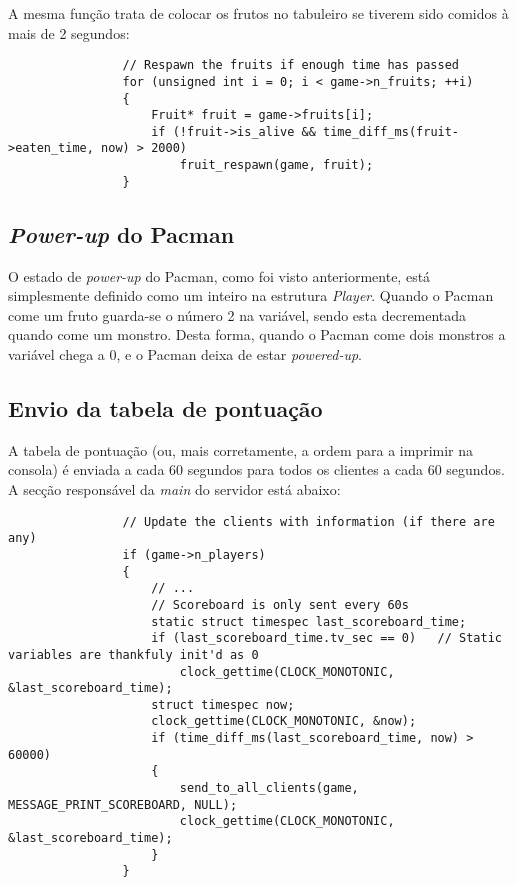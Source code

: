\documentclass[a4paper]{report}
\begin{document}
            \par A mesma função trata de colocar os frutos no tabuleiro se tiverem sido comidos à mais de 2 segundos:
            \begin{lstlisting}
                // Respawn the fruits if enough time has passed
                for (unsigned int i = 0; i < game->n_fruits; ++i)
                {
                    Fruit* fruit = game->fruits[i];
                    if (!fruit->is_alive && time_diff_ms(fruit->eaten_time, now) > 2000)
                        fruit_respawn(game, fruit);
                }            
            \end{lstlisting}

        \subsection{\textit{Power-up} do Pacman}
            \par O estado de \textit{power-up} do Pacman, como foi visto anteriormente, está simplesmente definido como um inteiro na estrutura \textit{Player}. Quando o Pacman come um fruto guarda-se o número 2 na variável, sendo esta decrementada quando come um monstro. Desta forma, quando o Pacman come dois monstros a variável chega a 0, e o Pacman deixa de estar \textit{powered-up}.

        \subsection{Envio da tabela de pontuação}
            \par A tabela de pontuação (ou, mais corretamente, a ordem para a imprimir na consola) é enviada a cada 60 segundos para todos os clientes a cada 60 segundos. A secção responsável da \textit{main} do servidor está abaixo:
            \begin{lstlisting}
                // Update the clients with information (if there are any)
                if (game->n_players)
                {
                    // ...
                    // Scoreboard is only sent every 60s
                    static struct timespec last_scoreboard_time;
                    if (last_scoreboard_time.tv_sec == 0)   // Static variables are thankfuly init'd as 0
                        clock_gettime(CLOCK_MONOTONIC, &last_scoreboard_time);
                    struct timespec now;
                    clock_gettime(CLOCK_MONOTONIC, &now);
                    if (time_diff_ms(last_scoreboard_time, now) > 60000)
                    {
                        send_to_all_clients(game, MESSAGE_PRINT_SCOREBOARD, NULL);
                        clock_gettime(CLOCK_MONOTONIC, &last_scoreboard_time);
                    }
                }
            \end{lstlisting}
\end{document}
